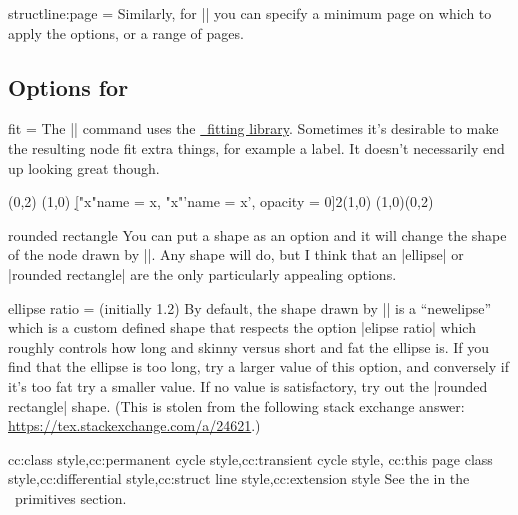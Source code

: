 \begin{sseqdata}[name = basic, cohomological Serre grading]
\begin{key}{structline:page = }
Similarly, for |\structlineoptions| you can specify a minimum page on which to
apply the options, or a range of pages.
\end{key}

\subsection{Options for \sectionstring\circleclass}
\begin{key}{fit = }%
The |\circleclasses| command uses the \href{\pgfmanualurl#section.52}{\tikzpkg\
fitting library}. Sometimes it's desirable to make the resulting node fit extra
things, for example a label. It doesn't necessarily end up looking great though.
\begin{codeexample}[]
\begin{sseqpage}[ Adams grading, axes gap = 0.7cm ]
\class(0,2)
\class(1,0)
\d["x"{name = x}, "x"'{name = x', opacity = 0}]2(1,0)
\circleclasses[fit = (x)(x'), rounded rectangle](1,0)(0,2)
\end{sseqpage}
\end{codeexample}
\end{key}

\begin{key}{rounded rectangle}
You can put a shape as an option and it will change the shape of the node drawn
by |\circleclasses|. Any shape will do, but I think that an |ellipse| or
|rounded rectangle| are the only particularly appealing options.
\end{key}

\begin{key}{ellipse ratio =  (initially 1.2)}%
By default, the shape drawn by |\circleclasses| is a ``newelipse'' which is a
custom defined shape that respects the option |elipse ratio| which roughly
controls how long and skinny versus short and fat the ellipse is. If you find
that the ellipse is too long, try a larger value of this option, and conversely
if it's too fat try a smaller value. If no value is satisfactory, try out the
|rounded rectangle| shape. (This is stolen from the following stack exchange
answer: \url{https://tex.stackexchange.com/a/24621}.)
\end{key}

\begin{keylist}{
    cc:class style,cc:permanent cycle style,cc:transient cycle style,
    cc:this page class style,cc:differential style,cc:struct line style,cc:extension style
}
See the  in the \tikzpkg\
primitives section.
\end{keylist}


\end{sseqdata}
